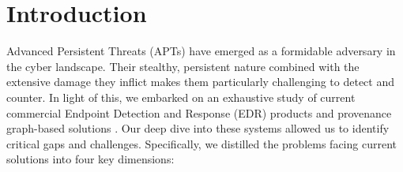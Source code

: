 \section{Introduction}
Advanced Persistent Threats (APTs) have emerged as a formidable adversary in the cyber landscape. Their stealthy, persistent nature combined with the extensive damage they inflict makes them particularly challenging to detect and counter. In light of this, we embarked on an exhaustive study of current commercial Endpoint Detection and Response (EDR) products \cite{karantzas2021empirical} and provenance graph-based solutions \cite{cheng2023kairos,alsaheel2021atlas,han2020unicorn,inam2022sok,han2021sigl}. Our deep dive into these systems allowed us to identify critical gaps and challenges. Specifically, we distilled the problems facing current solutions into four key dimensions:


